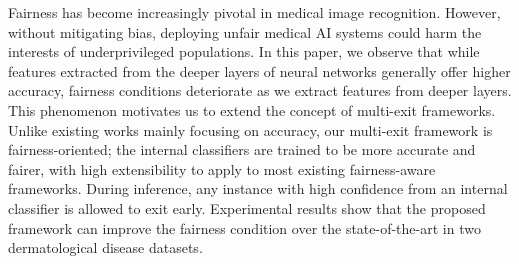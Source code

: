 Fairness has become increasingly pivotal in medical image recognition. However, without mitigating bias, deploying unfair medical AI systems could harm the interests of underprivileged populations. In this paper, we observe that while features extracted from the deeper layers of neural networks generally offer higher accuracy, fairness conditions deteriorate as we extract features from deeper layers. This phenomenon motivates us to extend the concept of multi-exit frameworks. Unlike existing works mainly focusing on accuracy, our multi-exit framework is fairness-oriented; the internal classifiers are trained to be more accurate and fairer, with high extensibility to apply to most existing fairness-aware frameworks. During inference, any instance with high confidence from an internal classifier is allowed to exit early. Experimental results show that the proposed framework can improve the fairness condition over the state-of-the-art in two dermatological disease datasets.




